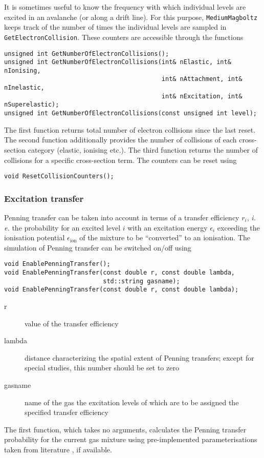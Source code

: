 It is sometimes useful to know the frequency with which individual levels 
are excited in an avalanche (or along a drift line). 
For this purpose, \texttt{MediumMagboltz} keeps track of the number of times 
the individual levels are sampled in \texttt{GetElectronCollision}. 
These counters are accessible through the functions
\begin{lstlisting}
unsigned int GetNumberOfElectronCollisions();
unsigned int GetNumberOfElectronCollisions(int& nElastic, int& nIonising, 
                                           int& nAttachment, int& nInelastic, 
                                           int& nExcitation, int& nSuperelastic);
unsigned int GetNumberOfElectronCollisions(const unsigned int level);
\end{lstlisting}
The first function returns total number of electron collisions 
since the last reset. 
The second function additionally provides the number of collisions of each 
cross-section category (elastic, ionising etc.). 
The third function returns the number of collisions for a specific cross-section term.
The counters can be reset using
\begin{lstlisting}
void ResetCollisionCounters();
\end{lstlisting} 

\subsubsection{Excitation transfer}\label{Sec:PenningTransfer}

Penning transfer can be taken into account in terms of a transfer efficiency 
\(r_{i}\), \textit{i.\,e.} the probability for an excited level \(i\) with an  
excitation energy \(\epsilon_{i}\) exceeding the ionisation potential 
\(\epsilon_{\text{ion}}\) of the mixture to 
be ``converted'' to an ionisation.
The simulation of Penning transfer can be switched on/off using
\begin{lstlisting}
void EnablePenningTransfer();
void EnablePenningTransfer(const double r, const double lambda, 
                           std::string gasname);
void EnablePenningTransfer(const double r, const double lambda);
\end{lstlisting}
\begin{description}
  \item[r] value of the transfer efficiency
  \item[lambda] distance characterizing the spatial extent of Penning transfers; 
                except for special studies, this number should be set to zero
  \item[gasname] name of the gas the excitation levels of which are to be assigned 
                 the specified transfer efficiency 
\end{description}
The first function, which takes no arguments, 
calculates the Penning transfer probability for the current gas mixture
using pre-implemented parameterisations taken from literature 
\cite{Sahin2010,Sahin2017,Sahin2018,Sahin2021}, if available. 

